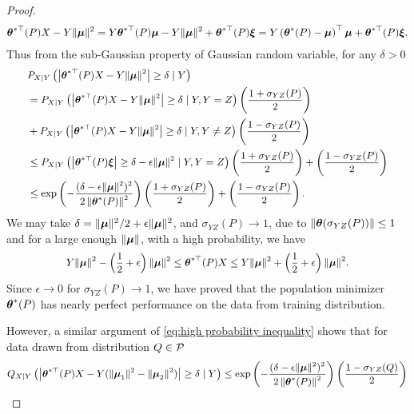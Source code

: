 \begin{proof}
\begin{equation}
\begin{aligned}
			\text{\boldmath{$\theta$}}^{*\top}(P)X - Y\|\text{\boldmath{$\mu$}}\|^{2} = Y\text{\boldmath{$\theta$}}^{*\top}(P)\text{\boldmath{$\mu$}} - Y\|\text{\boldmath{$\mu$}}\|^{2} + \text{\boldmath{$\theta$}}^{*\top}(P)\boldsymbol{\xi} =  Y\left(\text{\boldmath{$\theta$}}^{*}(P) - \text{\boldmath{$\mu$}}\right)^{\top}\text{\boldmath{$\mu$}} + \text{\boldmath{$\theta$}}^{*\top}(P)\boldsymbol{\xi}.
		\end{aligned}
	\end{equation}
	Thus from the sub-Gaussian property of Gaussian random variable, for any $\delta > 0$
	\begin{equation}\label{eq:high probability inequality}
		\small
		\begin{aligned}
			& P_{X\mid Y}\left(\left|\btheta^{*\top}(P)X - Y\|\bmu\|^{2}\right|\geq \delta\mid Y\right) \\
			&= P_{X\mid Y}\left(\left|\btheta^{*\top}(P)X - Y\|\bmu\|^{2}\right|\geq \delta\mid Y, Y = Z\right)\left(\frac{1 + \sigma_{YZ}(P)}{2}\right) \\
			& + P_{X\mid Y}\left(\left|\btheta^{*\top}(P)X - Y\|\bmu\|^{2}\right|\geq \delta\mid Y, Y \neq Z\right)\left(\frac{1 - \sigma_{YZ}(P)}{2}\right) \\
			& \leq P_{X\mid Y}\left(\left|\btheta^{*\top}(P)\bxi\right|\geq \delta - \epsilon\|\bmu\|^{2}\mid Y, Y = Z\right)\left(\frac{1 + \sigma_{YZ}(P)}{2}\right) + \left(\frac{1 - \sigma_{YZ}(P)}{2}\right) \\
			& \leq \exp\left(-\frac{(\delta - \epsilon\|\bmu\|^{2})^{2}}{2\left\|\btheta^{*}(P)\right\|^{2}}\right)\left(\frac{1 + \sigma_{YZ}(P)}{2}\right) + \left(\frac{1 - \sigma_{YZ}(P)}{2}\right).
		\end{aligned}
	\end{equation}
	We may take $\delta = \|\text{\boldmath{$\mu$}}\|^{2}/2 + \epsilon\|\text{\boldmath{$\mu$}}\|^{2}$, and $\sigma_{YZ}(P)\to 1$, due to $\|\text{\boldmath{$\theta$}}(\sigma_{YZ}(P))\| \leq 1$ and for a large enough $\|\text{\boldmath{$\mu$}}\|$, with a high probability, we have 
	\begin{equation}
		\small
		Y\|\bmu\|^{2} - \left(\frac{1}{2} + \epsilon\right)\|\bmu\|^{2}\leq \btheta^{*\top}(P)X \leq Y\|\bmu\|^{2} + \left(\frac{1}{2} + \epsilon\right)\|\bmu\|^{2}.
	\end{equation}
	Since $\epsilon\to 0$ for $\sigma_{YZ}(P)\to 1$, we have proved that the population minimizer $\text{\boldmath{$\theta$}}^{*}(P)$ has nearly perfect performance on the data from training distribution. 
	\par
	However, a similar argument of \eqref{eq:high probability inequality} shows that for data drawn from distribution $Q\in\mathcal{P}$
	\begin{equation}
		\small
		\begin{aligned}
		Q_{X\mid Y}\left(\left|\btheta^{*\top}(P)X - Y(\|\bmu_{1}\|^{2} - \|\bmu_{2}\|^{2})\right|\geq \delta\mid Y\right) & \leq  \exp\left(-\frac{(\delta - \epsilon\|\bmu\|^{2})^{2}}{2\left\|\btheta^{*}(P)\right\|^{2}}\right)\left(\frac{1 - \sigma_{YZ}(Q)}{2}\right) \\

\end{aligned}
\end{equation}
\end{proof}
